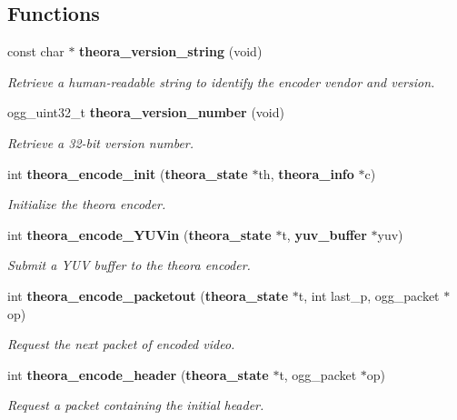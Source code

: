 \subsection*{Functions}
\begin{CompactItemize}
\item 
const char $\ast$ {\bf theora\_\-version\_\-string} (void)
\begin{CompactList}\small\item\em Retrieve a human-readable string to identify the encoder vendor and version. \item\end{CompactList}\item 
ogg\_\-uint32\_\-t {\bf theora\_\-version\_\-number} (void)
\begin{CompactList}\small\item\em Retrieve a 32-bit version number. \item\end{CompactList}\item 
int {\bf theora\_\-encode\_\-init} ({\bf theora\_\-state} $\ast$th, {\bf theora\_\-info} $\ast$c)
\begin{CompactList}\small\item\em Initialize the theora encoder. \item\end{CompactList}\item 
int {\bf theora\_\-encode\_\-YUVin} ({\bf theora\_\-state} $\ast$t, {\bf yuv\_\-buffer} $\ast$yuv)
\begin{CompactList}\small\item\em Submit a YUV buffer to the theora encoder. \item\end{CompactList}\item 
int {\bf theora\_\-encode\_\-packetout} ({\bf theora\_\-state} $\ast$t, int last\_\-p, ogg\_\-packet $\ast$op)
\begin{CompactList}\small\item\em Request the next packet of encoded video. \item\end{CompactList}\item 
int {\bf theora\_\-encode\_\-header} ({\bf theora\_\-state} $\ast$t, ogg\_\-packet $\ast$op)
\begin{CompactList}\small\item\em Request a packet containing the initial header. \item\end{CompactList}\item 

\end{CompactItemize}
